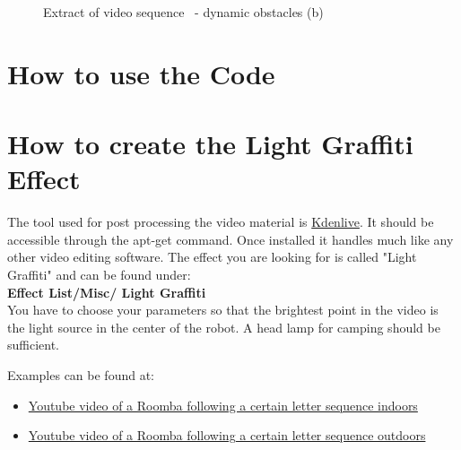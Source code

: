 \documentclass[oneside,12pt,fancychapters]{scrbook} %
\begin{document}
\begin{figure}
\centering     %
{}
\caption{Extract of video sequence~\cite{???!!!} - dynamic obstacles (b)}
\label{fig:video_dynamic_2}
\end{figure}


\chapter{How to use the Code}
\chapter{How to create the Light Graffiti Effect}
The tool used for post processing the video material is \href{https://kdenlive.org/}{Kdenlive}.
It should be accessible through the apt-get command.
Once installed it handles much like any other video editing software.
The effect you are looking for is called "Light Graffiti" and can be found under:\\
\textbf{Effect List/Misc/ Light Graffiti} \\
You have to choose your parameters so that the brightest point in the video is the light source in the center of the robot.
A head lamp for camping should be sufficient. 


\vspace {0.5cm}

Examples can be found at:

\begin{itemize}
  \item \href{https://youtu.be/hPpPM0kasyk}{Youtube video of a Roomba following a certain letter sequence indoors}
  \item \href{https://youtu.be/g-6yrYu4PUs}{Youtube video of a Roomba following a certain letter sequence outdoors}
\end{itemize}
\end{document}
